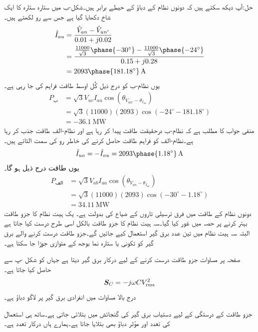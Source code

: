 حل:آپ دیکھ سکتے ہیں کہ دونوں نظام کے دباؤ کے حیطے برابر ہیں۔شکل-ب میں ستارہ ستارہ کا ایک شاخ دکھایا گیا ہے جس سے  رو لکھتے ہیں۔
\begin{align*}
\hat{I}_{au}&=\frac{\hat{V}_{an}-\hat{V}_{un'}}{0.01+j0.02}\\
&=\frac{\frac{11000}{\sqrt{3}}\phase{-30^{\circ}}-\frac{11000}{\sqrt{3}}\phase{-24^{\circ}}}{0.15+j0.28}\\
&=2093\phase{181.18^{\circ}}\,\si{\ampere}
\end{align*}
یوں نظام-ب کو درج ذیل کُل اوسط طاقت فراہم کی جا رہی ہے۔
\begin{align*}
P_{\text{ب}}&=\sqrt{3} V_{uv} I_{au} \cos(\theta_{V_{un'}-\theta_{I_{au}}})\\
&=\sqrt{3} (11000)(2093)\cos(-24^{\circ}-181.18^{\circ})\\
&=\SI{-36.1}{\mega\watt}
\end{align*}
منفی جواب کا مطلب ہے کہ نظام-ب درحقیقت طاقت پیدا کر رہا ہے اور نظام-الف طاقت جذب کر رہا ہے۔نظام-الف کو فراہم طاقت حاصل کرنے کی خاطر رو کی سمت الٹاتے ہیں۔
\begin{align*}
\hat{I}_{ua}=-\hat{I}_{au}=2093\phase{1.18^{\circ}}\,\si{\ampere}
\end{align*}
یوں طاقت درج ذیل ہو گا۔
\begin{align*}
P_{\text{الف}}&=\sqrt{3} V_{ab} I_{ua} \cos(\theta_{V_{an}-\theta_{I_{ua}}})\\
&=\sqrt{3} (11000)(2093)\cos(-30^{\circ}-1.18^{\circ})\\
&=\SI{34.11}{\mega\watt}
\end{align*}
دونوں نظام کے طاقت میں فرق ترسیلی تاروں کے ضیاع کی بدولت ہے۔ 
یک ہیت نظام کا جزو طاقت بہتر کرنے پر  حصہ  میں غور کیا گیا۔سہ ہیت نظام کا جزو طاقت بالکل اسی طرح درست کیا جاتا ہے البتہ سہ ہیت نظام میں تین عدد برق گیر استعمال کیے جائیں گے۔جزو طاقت درست کرنے والے برق گیر کو تکونی یا ستارہ نما بوجھ کے متوازی جوڑا جا سکتا ہے۔

صفحہ  پر مساوات  جزو طاقت درست کرنے کے لیے درکار برق گیر دیتا ہے جہاں  کو شکل -پ سے حاصل کیا جاتا ہے۔
\begin{align*}
{\ensuremath{{\boldsymbol{S}}}}_C=-j \omega C {V^2_{\textup{rms}}}
\end{align*}
درج بالا مساوات میں  انفرادی برق گیر پر لاگو دباؤ ہے۔

جزو طاقت کے درستگی کے لیے دستیاب برق گیر کی گنجائش  میں بتلائی جاتی ہے۔ساتھ ہی  استعمال کی تعدد اور مؤثر دباؤ بھی بتلایا جاتا ہے۔ہمارے ہاں  درکار تعدد ہے۔

